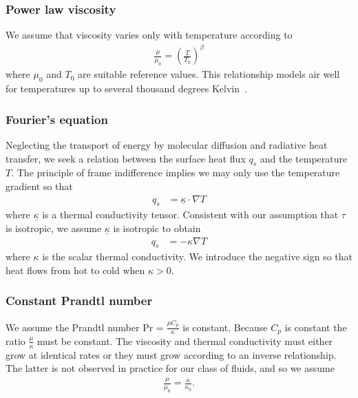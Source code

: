 \documentclass[letterpaper,11pt,nointlimits,reqno,draft]{amsart}
\newcommand{\Prandtl}[1][]{\ensuremath{\mbox{Pr}_{#1}}}
\begin{document}
\subsubsection{Power law viscosity}

We assume that viscosity varies only with temperature according to
\begin{align}
\label{eq:powerlawviscosity}
\frac{\mu}{\mu_{0}}=\left(\frac{T}{T_{0}}\right)^{\beta}
\end{align}
where $\mu_{0}$ and $T_{0}$ are suitable reference values.  This
relationship models air well for temperatures up to several thousand
degrees Kelvin~\cite{NASA-TR-R-132}.

\subsubsection{Fourier's equation}

Neglecting the transport of energy by molecular diffusion and radiative
heat transfer, we seek a relation between the surface heat flux $q_{s}$
and the temperature $T$.  The principle of frame indifference implies
we may only use the temperature gradient so that
\begin{align}
  \label{eq:fouriertensorlaw}
  q_{s} &= \underline{\kappa} \cdot \nabla{} T
\end{align}
where $\underline{\kappa}$ is a thermal conductivity tensor.
Consistent with our assumption that $\tau$ is isotropic, we assume
$\underline{\kappa}$ is isotropic to obtain
\begin{align}
  \label{eq:fourierlaw}
  q_{s} &= - \kappa \nabla{} T
\end{align}
where $\kappa$ is the scalar thermal conductivity.  We introduce the
negative sign so that heat flows from hot to cold when $\kappa>0$.

\subsubsection{Constant Prandtl number}

We assume the Prandtl number $\Prandtl = \frac{\mu{}C_{p}}{\kappa}$ is constant.
Because $C_{p}$ is constant the ratio $\frac{\mu}{\kappa}$ must be
constant.  The viscosity and thermal conductivity must either grow at
identical rates or they must grow according to an inverse relationship.
The latter is not observed in practice for our class of fluids, and
so we assume
\begin{align}
  \frac{\mu}{\mu_{0}} = \frac{\kappa}{\kappa_{0}}
  .
  \label{eq:mukappa}
\end{align}
\end{document}
